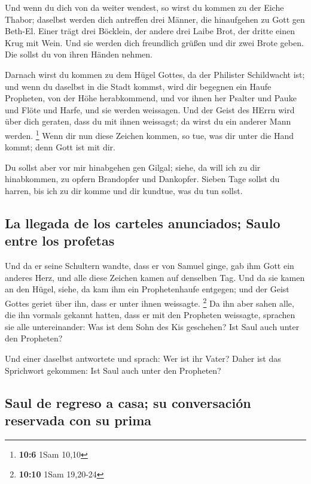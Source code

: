  Und wenn du dich von da weiter wendest, so wirst du
kommen zu der Eiche Thabor; daselbst werden dich antreffen drei Männer,
die hinaufgehen zu Gott gen Beth-El. Einer trägt drei Böcklein, der
andere drei Laibe Brot, der dritte einen Krug mit Wein. 
Und sie werden dich freundlich grüßen und dir zwei Brote geben. Die
sollst du von ihren Händen nehmen.

 Darnach wirst du kommen zu dem Hügel Gottes, da der
Philister Schildwacht ist; und wenn du daselbst in die Stadt kommst,
wird dir begegnen ein Haufe Propheten, von der Höhe herabkommend, und
vor ihnen her Psalter und Pauke und Flöte und Harfe, und sie werden
weissagen.  Und der Geist des HErrn wird über dich
geraten, dass du mit ihnen weissagst; da wirst du ein anderer Mann
werden. \footnote{\textbf{10:6} 1Sam 10,10}  Wenn dir nun
diese Zeichen kommen, so tue, was dir unter die Hand kommt; denn Gott
ist mit dir.

 Du sollst aber vor mir hinabgehen gen Gilgal; siehe, da
will ich zu dir hinabkommen, zu opfern Brandopfer und Dankopfer. Sieben
Tage sollst du harren, bis ich zu dir komme und dir kundtue, was du tun
sollst.

\hypertarget{la-llegada-de-los-carteles-anunciados-saulo-entre-los-profetas}{%
\subsection{La llegada de los carteles anunciados; Saulo entre los
profetas}\label{la-llegada-de-los-carteles-anunciados-saulo-entre-los-profetas}}

 Und da er seine Schultern wandte, dass er von Samuel
ginge, gab ihm Gott ein anderes Herz, und alle diese Zeichen kamen auf
denselben Tag.  Und da sie kamen an den Hügel, siehe, da
kam ihm ein Prophetenhaufe entgegen; und der Geist Gottes geriet über
ihn, dass er unter ihnen weissagte. \footnote{\textbf{10:10} 1Sam
  19,20-24}  Da ihn aber sahen alle, die ihn vormals
gekannt hatten, dass er mit den Propheten weissagte, sprachen sie alle
untereinander: Was ist dem Sohn des Kis geschehen? Ist Saul auch unter
den Propheten?

 Und einer daselbst antwortete und sprach: Wer ist ihr
Vater? Daher ist das Sprichwort gekommen: Ist Saul auch unter den
Propheten?

\hypertarget{saul-de-regreso-a-casa-su-conversaciuxf3n-reservada-con-su-prima}{%
\subsection{Saul de regreso a casa; su conversación reservada con su
prima}\label{saul-de-regreso-a-casa-su-conversaciuxf3n-reservada-con-su-prima}}

